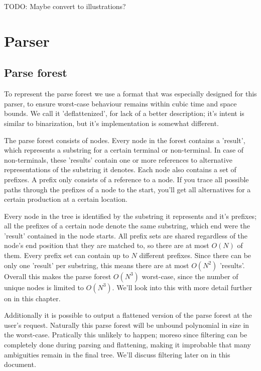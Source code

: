 \documentclass[a4paper,10pt]{article}
\begin{document}
TODO: Maybe convert to illustrations?

\section{Parser}

\subsection{Parse forest}

To represent the parse forest we use a format that was especially designed for this parser, to ensure worst-case behaviour remains within cubic time and space bounds. We call it 'deflattenized', for lack of a better description; it's intent is similar to binarization, but it's implementation is somewhat different.

The parse forest consists of nodes. Every node in the forest contains a 'result', which represents a substring for a certain terminal or non-terminal. In case of non-terminals, these 'results' contain one or more references to alternative representations of the substring it denotes. Each node also contains a set of prefixes. A prefix only consists of a reference to a node. If you trace all possible paths through the prefixes of a node to the start, you'll get all alternatives for a certain production at a certain location.

Every node in the tree is identified by the substring it represents and it's prefixes; all the prefixes of a certain node denote the same substring, which end were the 'result' contained in the node starts. All prefix sets are shared regardless of the node's end position that they are matched to, so there are at most $O(N)$ of them. Every prefix set can contain up to $N$ different prefixes. Since there can be only one 'result' per substring, this means there are at most $O(N^{2})$ 'results'. Overall this makes the parse forest $O(N^{3})$ worst-case, since the number of unique nodes is limited to $O(N^{3})$. We'll look into this with more detail further on in this chapter.

Additionally it is possible to output a flattened version of the parse forest at the user's request. Naturally this parse forest will be unbound polynomial in size in the worst-case. Pratically this unlikely to happen; moreso since filtering can be completely done during parsing and flattening, making it improbable that many ambiguities remain in the final tree. We'll discuss filtering later on in this document.
\end{document}
